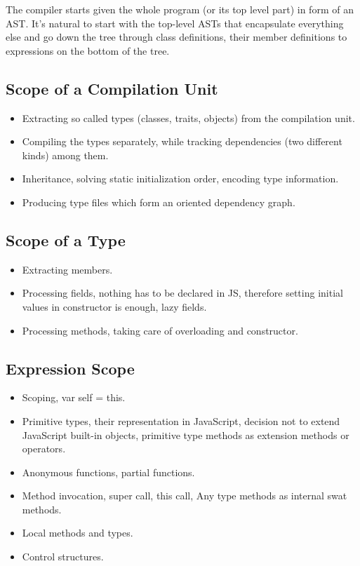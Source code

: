 \documentclass[12pt,a4paper]{report}
\begin{document}
The compiler starts given the whole program (or its top level part) in form of an AST. It's natural to start with the top-level ASTs that encapsulate everything else and go down the tree through class definitions, their member definitions to expressions on the bottom of the tree.

\subsection{Scope of a Compilation Unit}

\begin{itemize}
\item Extracting so called types (classes, traits, objects) from the compilation unit.
\item Compiling the types separately, while tracking dependencies (two different kinds) among them.
\item Inheritance, solving static initialization order, encoding type information.
\item Producing type files which form an oriented dependency graph.
\end{itemize}

\subsection{Scope of a Type}

\begin{itemize}
\item Extracting members.
\item Processing fields, nothing has to be declared in JS, therefore setting initial values in constructor is enough, lazy fields.
\item Processing methods, taking care of overloading and constructor.
\end{itemize}

\subsection{Expression Scope}

\begin{itemize}
\item Scoping, var self = this.
\item Primitive types, their representation in JavaScript, decision not to extend JavaScript built-in objects, primitive type methods as extension methods or operators.
\item Anonymous functions, partial functions.
\item Method invocation, super call, this call, Any type methods as internal swat methods.
\item Local methods and types.
\item Control structures.
\end{itemize}
\end{document}
